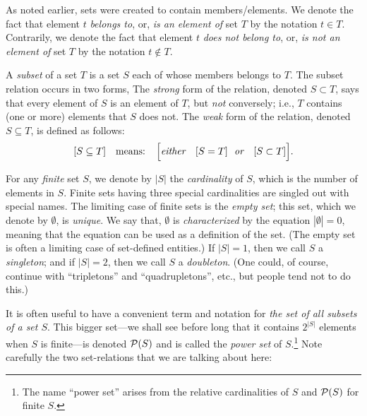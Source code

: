 \medskip

 
As noted earlier, sets were created to contain members/elements.  We denote the fact that element $t$ {\it belongs to}, or, {\it is an element of} set $T$ by the notation $t \in T$.  Contrarily,
we denote the fact that element $t$ {\it does not belong to}, or, {\it is not an element of} set $T$ by the notation $t \not\in T$. 

\smallskip

  
A {\em subset} of a set $T$ is a set $S$ each of whose members belongs to $T$.  The subset relation occurs in two forms, The {\em strong} form of the relation, denoted $S \subset T$, says that every element of $S$ is an element of $T$, but {\em not} conversely; i.e., $T$ contains (one or more) elements that $S$ does not.  The {\em weak} form of the relation, denoted $S \subseteq T$, is defined as follows:
\[
[S \subseteq T] \ \ \mbox{ means: } \ \
\Big[ \mbox{\em either } \ \ [S = T]
\ \ \mbox{\em or } \ \ [S \subset T] \Big].
\]

   
\index{set!empty set} \index{set!doubleton}
For any {\em finite} set $S$, we denote by $|S|$ the {\it cardinality} of $S$, which is the number of elements in $S$.  Finite sets having three special cardinalities are singled out with special names.  The limiting case of finite sets is the {\em empty set}; this set, which we denote by
$\emptyset$, is {\em unique}.  We say that, $\emptyset$ is {\it characterized} by the equation $|\emptyset| = 0$, meaning that the equation can be used as a definition of the set.  (The empty set is often a limiting case of set-defined entities.)  If $|S| = 1$, then we call $S$ a {\em singleton}; and if $|S| = 2$, then we call $S$ a {\em doubleton}.  (One could, of course, continue with ``tripletons'' and ``quadrupletons'', etc., but people tend not to do this.)

\smallskip

It is often useful to have a convenient term and notation for {\em the set of all subsets of a set $S$}.  This bigger set---we shall see before long that it contains $2^{|S|}$ elements when $S$ is finite---is denoted $\mbox{$\cal P$}(S)$ and is called the {\em power set} of $S$.\footnote{The name ``power set'' arises from the relative cardinalities of $S$ and ${\cal P}(S)$ for finite $S$.}  Note carefully the two set-relations that we are talking about here: 

